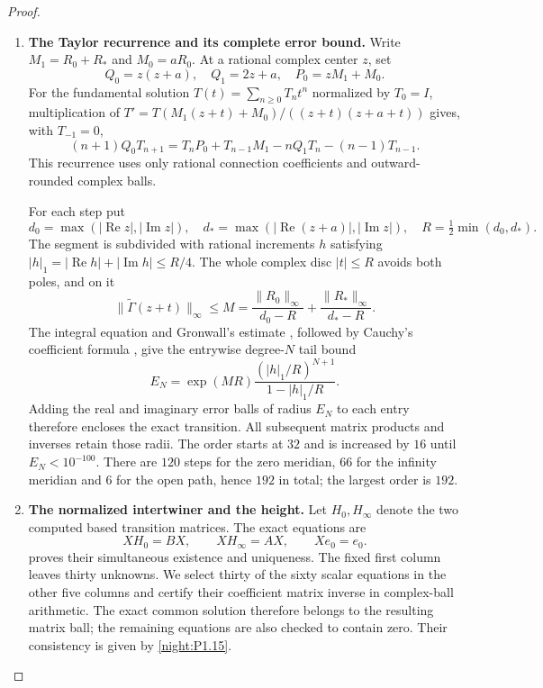 \begin{proof}
\begin{enumerate}[label={$\langle1\rangle$\arabic*.}]
\item \textbf{The Taylor recurrence and its complete error bound.}
Write $M_1=R_0+R_*$ and $M_0=aR_0$.  At a rational complex center
$z$, set
\[
 Q_0=z(z+a),\quad Q_1=2z+a,\quad P_0=zM_1+M_0.
\]
For the fundamental solution $T(t)=\sum_{n\ge0}T_nt^n$ normalized
by $T_0=I$, multiplication of
$T'=T(M_1(z+t)+M_0)/((z+t)(z+a+t))$ gives, with $T_{-1}=0$,
\[
 (n+1)Q_0T_{n+1}
 =T_nP_0+T_{n-1}M_1-nQ_1T_n-(n-1)T_{n-1}.
\]
This recurrence uses only rational connection coefficients and
outward-rounded complex balls.

For each step put
\[
 d_0=\max(|\operatorname{Re}z|,|\operatorname{Im}z|),\quad
 d_*=\max(|\operatorname{Re}(z+a)|,|\operatorname{Im}z|),
 \quad R=\tfrac12\min(d_0,d_*).
\]
The segment is subdivided with rational increments $h$ satisfying
$|h|_1=|\operatorname{Re}h|+|\operatorname{Im}h|\le R/4$.
The whole complex disc $|t|\le R$ avoids both poles, and on it
\[
 \|\widetilde\Gamma(z+t)\|_\infty\le
 M=\frac{\|R_0\|_\infty}{d_0-R}
   +\frac{\|R_*\|_\infty}{d_*-R}.
\]
The integral equation and Gronwall's estimate
\cite[Lemma~2.7, pp.~42--43]{TeschlODE2012}, followed by Cauchy's
coefficient formula
\cite[\S1.9(iii), (1.9.30)--(1.9.31)]{DLMFCauchy2026}, give the
entrywise degree-$N$ tail bound
\[
 E_N=\exp(MR)\frac{(|h|_1/R)^{N+1}}{1-|h|_1/R}.
 \tag{1.16.1}
\]
Adding the real and imaginary error balls of radius $E_N$ to each
entry therefore encloses the exact transition.  All subsequent
matrix products and inverses retain those radii.  The order starts
at $32$ and is increased by $16$ until $E_N<10^{-100}$.
There are $120$ steps for the zero meridian, $66$ for the infinity
meridian and $6$ for the open path, hence $192$ in total; the
largest order is $192$.  

\item \textbf{The normalized intertwiner and the height.}
Let $H_0,H_\infty$ denote the two computed based transition matrices.
The exact equations are
\[
 XH_0=BX,\qquad XH_\infty=AX,\qquad Xe_0=e_0.
\]
 proves their simultaneous existence and uniqueness.  The
fixed first column leaves thirty unknowns.  We select thirty of
the sixty scalar equations in the other five columns and certify
their coefficient matrix inverse in complex-ball arithmetic.
The exact common solution therefore belongs to the resulting
matrix ball; the remaining equations are also checked to contain
zero.  Their consistency is given by \cref{night:P1.15}.


\end{enumerate}
\end{proof}
